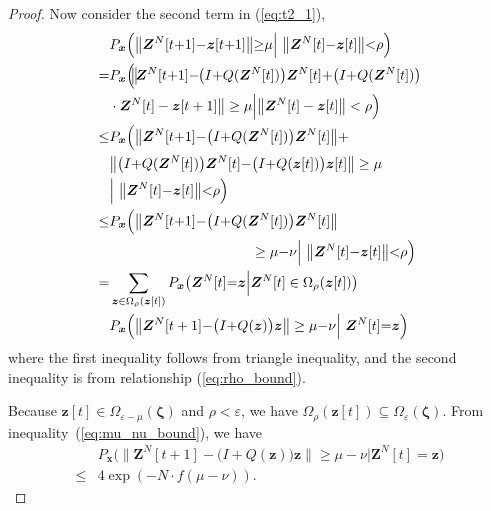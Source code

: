 \documentclass[11pt,twocolumn]{IEEEtran}
\begin{document}
\begin{proof}
Now consider the second term in (\ref{eq:t2_1}),
\begin{align}
&P_{\bm x}\Big(\big\|\bm Z^{N}[t{+}1]{-}\bm z[t{+}1] \big\| {\geq} \mu \Big| \ \big\| \bm Z^{N}[t]{-}\bm z[t] \big\| {<} \rho \Big) \nonumber \\
=& P_{\bm x}\Big(\hspace{-3pt}\big\|\hspace{-2pt}\bm Z^{N}[t{+}1]{-}\hspace{-1pt}\big(I{+}Q(\bm Z^{N}[t])\big) \bm Z^{N}[t]{+}\big(I{+}Q(\bm Z^{N}[t])\big)\nonumber\\
& \cdot\bm Z^{N}[t] -\bm z[t+1] \big\| \geq \mu \Big|\big\| \bm Z^{N}[t]-\bm z[t] \big\| < \rho \Big) \nonumber \\
\leq & P_{\bm x}\Big(\big\| \bm Z^{N}[t{+}1]{-}\big(I{+}Q(\bm Z^{N}[t])\big) \bm Z^{N}[t] \big\|{+}\nonumber\\
&\big\| \big(I{+}Q(\bm Z^{N}[t])\big) \bm Z^{N}[t]{-}\big(I{+}Q(\bm z[t])\big)\bm z[t] \big\| \geq \mu \nonumber\\
&\Big| \ \big\| \bm Z^{N}[t]{-}\bm z[t] \big\| {<} \rho \Big) \nonumber \\
\leq & P_{\bm x}\Big(\big\|\bm Z^{N}[t{+}1]{-}\big(I{+}Q(\bm Z^{N}[t])\big) \bm Z^{N}[t] \big\|\nonumber\\
&\hspace{1.4in} \geq \mu{-}\nu \Big| \ \big\| \bm Z^{N}[t]{-}\bm z[t] \big\| {<} \rho \Big) \nonumber \\
= & \sum_{\bm z \in \Omega_{\rho}(\bm z[t])} P_{\bm x}\big(\bm Z^{N}[t]{=}\bm z\Big| \bm Z^{N}[t] \in \Omega_{\rho}(\bm z[t]) \big)\nonumber\\
&P_{\bm x}\Big(\big\| \bm Z^{N}[t+1]{-} \big(I{+}Q(\bm z)\big) \bm z \big\|\geq \mu{-}\nu \Big| \ \bm Z^{N}[t]{=}\bm z \Big) \label{eq:t2_2ineq}
\end{align}
where the first inequality follows from triangle inequality, and the second inequality is from relationship (\ref{eq:rho_bound}).

Because $\bm z[t] \in \Omega_{\varepsilon-\mu}(\bm \zeta)$ and $\rho<\varepsilon$, we have $\Omega_{\rho}(\bm z[t]) \subseteq \Omega_{\varepsilon}(\bm \zeta)$. From inequality~(\ref{eq:mu_nu_bound}), we have
\begin{align}
&P_{\bm x}\Big(\big\| \bm Z^{N}[t{+}1]{-}\big(I{+}Q(\bm z)\big) \bm z \big\| {\geq} \mu{-}\nu \Big| \bm Z^{N}[t]=\bm z \Big)\nonumber\\
\leq& 4 \exp(-N\cdot f(\mu-\nu)). \label{eq:t2_2}
\end{align}


\end{proof}
\end{document}
